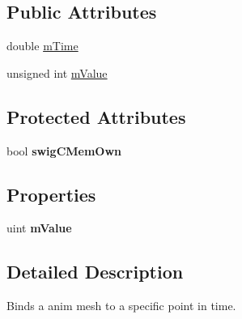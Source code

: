\subsection*{Public Attributes}
\begin{DoxyCompactItemize}
\item 
double \hyperlink{structai_mesh_key_a0814e4b14ed162295ba19331410a51ab}{m\+Time}
\item 
unsigned int \hyperlink{structai_mesh_key_abdd5914697609a9d876f63b6ca090a18}{m\+Value}
\end{DoxyCompactItemize}
\subsection*{Protected Attributes}
\begin{DoxyCompactItemize}
\item 
\hypertarget{structai_mesh_key_a491c9cd8e2d171a85db678a8e2241a34}{bool {\bfseries swig\+C\+Mem\+Own}}\label{structai_mesh_key_a491c9cd8e2d171a85db678a8e2241a34}

\end{DoxyCompactItemize}
\subsection*{Properties}
\begin{DoxyCompactItemize}
\item 
\hypertarget{structai_mesh_key_ac48167a4b17c1e35cbfcbe194b0433b8}{uint {\bfseries m\+Value}}\label{structai_mesh_key_ac48167a4b17c1e35cbfcbe194b0433b8}

\end{DoxyCompactItemize}


\subsection{Detailed Description}
Binds a anim mesh to a specific point in time. 

